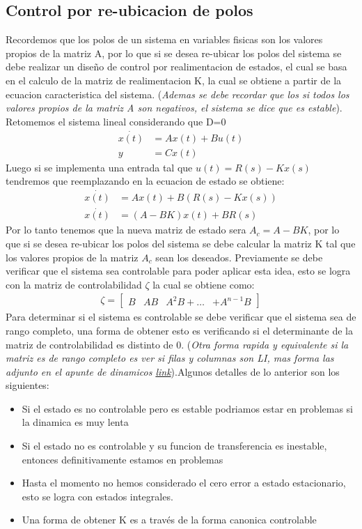 \documentclass[
  11pt,
  letterpaper,
   addpoints,
   answers
  ]{exam}
\begin{document}
\subsection{Control por re-ubicacion de polos}
Recordemos que los polos de un sistema en variables fisicas son los valores propios de la matriz A, por lo que si se desea re-ubicar los polos del sistema se debe realizar un diseño de control por realimentacion de estados, el cual se basa en el calculo de la matriz de realimentacion K, la cual se obtiene a partir de la ecuacion caracteristica del sistema. (\textit{Ademas se debe recordar que los si todos los valores propios de la matriz A son negativos, el sistema se dice que es estable}). Retomemos el sistema lineal considerando que D=0
\begin{align}
    \dot{x(t)} &= Ax(t) + Bu(t) \\
    y &= Cx(t)
\end{align}
Luego si se implementa una entrada tal que $u(t) = R(s) -Kx(s)$ tendremos que reemplazando en la ecuacion de estado se obtiene:
\begin{align}
    \dot{x(t)} &= Ax(t) + B(R(s) - Kx(s))\\
    \dot{x(t)} &= (A - BK)x(t) + BR(s)
\end{align}
Por lo tanto tenemos que la nueva matriz de estado sera $A_{c} = A - BK$, por lo que si se desea re-ubicar los polos del sistema se debe calcular la matriz K tal que los valores propios de la matriz $A_{c}$ sean los deseados. Previamente se debe verificar que el sistema sea controlable para poder aplicar esta idea, esto se logra con la matriz de controlabilidad $\zeta$ la cual se obtiene como:
\begin{align}
    \zeta =
    \begin{bmatrix}
         B & AB & A^{2}B + \dots & + A^{n-1}B
    \end{bmatrix}
\end{align}
Para determinar si el sistema es controlable se debe verificar que el sistema sea de rango completo, una forma de obtener esto es verificando si el determinante de la matriz de controlabilidad es distinto de 0. (\textit{Otra forma rapida y equivalente si la matriz es de rango completo es ver si filas y columnas son LI, mas forma las adjunto en el apunte de dinamicos \href{https://www.u-cursos.cl/ingenieria/2024/1/EL3204/1/material_docente/detalle?id=7719473}{link}}).Algunos detalles de lo anterior son los siguientes:
\begin{itemize}
    \item Si el estado es no controlable pero es estable podriamos estar en problemas si la dinamica es muy lenta
    \item Si el estado no es controlable y su funcion de transferencia es inestable, entonces definitivamente estamos en problemas
    \item Hasta el momento no hemos considerado el cero error a estado estacionario, esto se logra con estados integrales.
    \item Una forma de obtener K es a través de la forma canonica controlable
\end{itemize}
\end{document}
